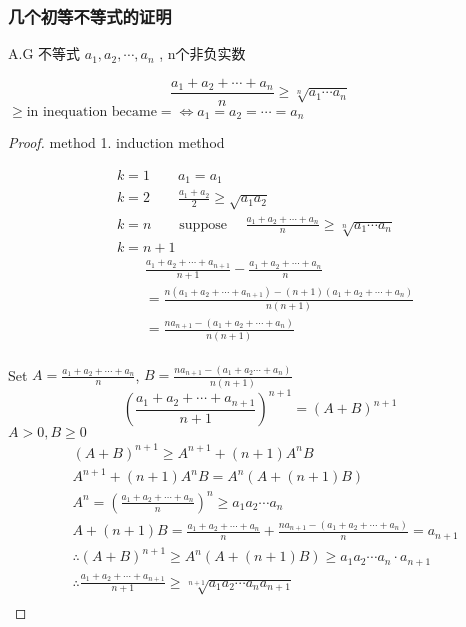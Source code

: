\subsubsection{几个初等不等式的证明}
A.G 不等式 $ a_1,a_2,\cdots,a_n $ , n个非负实数

\begin{equation}
	\frac{a_1+a_2+\cdots+a_n}{n} \ge \sqrt[n]{a_1\cdots a_n}
\end{equation}
$\ge \text{in inequation became} = \iff a_1=a_2=\cdots=a_n$


\begin{proof}
	
	method 1. induction method

\begin{align*}
	&k=1 \qquad a_1 = a_1 \\
	&k=2 \qquad \frac{a_1+a_2}{2}\ge\sqrt{a_1a_2} \\	
	&k=n  \qquad \text{suppose }\quad \frac{a_1+a_2+\cdots+a_n}{n} \ge \sqrt[n]{a_1\cdots a_n}  \\
	&k = n+1\\ 	&\qquad\frac{a_1+a_2+\cdots+a_{n+1}}{n+1} - \frac{a_1+a_2+\cdots+a_{n}}{n} \\
	&\qquad=\frac{n(a_1+a_2+\cdots+a_{n+1})-(n+1)(a_1+a_2+\cdots+a_n)}{n(n+1)} \\
	&\qquad=\frac{na_{n+1}-(a_1+a_2+\cdots+a_n)}{n(n+1)}  \\
\end{align*}




Set $ A = \frac{a_1+a_2+\cdots+a_n}{n} $, $ B = \frac{na_{n+1} - (a_1+a_2\cdots+a_n)}{n(n+1)} $\\
\begin{equation*}
	(\frac{a_1+a_2+\cdots+a_{n+1}}{n+1})^{n+1} = (A+B)^{n+1}
\end{equation*}
$ A>0, B\ge 0$
\begin{align*}
	&(A+B)^{n+1} \ge A^{n+1}+(n+1)A^n B\\
	&A^{n+1} + (n+1)A^n B = A^n(A+(n+1)B)\\	
	&A^n = (\frac{a_1+a_2+\cdots+a_n}{n})^n \ge a_1a_2\cdots a_n\\
	&A + (n+1)B = \frac{a_1+a_2+\cdots+a_n}{n} + \frac{na_{n+1}-(a_1+a_2+\cdots+a_n)}{n} = a_{n+1}\\
	&\therefore (A+B)^{n+1} \ge A^n(A+(n+1)B)\ge a_1a_2\cdots a_n\cdot a_{n+1}\\
	&\therefore \frac{a_1+a_2+\cdots+a_{n+1}}{n+1} \ge \sqrt[n+1]{a_1a_2\cdots a_na_{n+1}}\\
\end{align*}


\end{proof}
